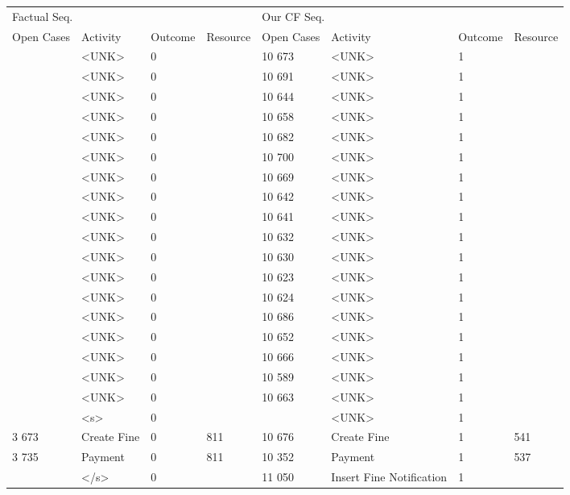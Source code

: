 \begin{tabular}{llllllll}
\toprule
\multicolumn{4}{l}{Factual Seq.} & \multicolumn{4}{l}{Our CF Seq.} \\
Open Cases & Activity & Outcome & Resource & Open Cases & Activity & Outcome & Resource \\
\midrule
 & <UNK> & 0 &  & 10 673 & <UNK> & 1 &  \\
 & <UNK> & 0 &  & 10 691 & <UNK> & 1 &  \\
 & <UNK> & 0 &  & 10 644 & <UNK> & 1 &  \\
 & <UNK> & 0 &  & 10 658 & <UNK> & 1 &  \\
 & <UNK> & 0 &  & 10 682 & <UNK> & 1 &  \\
 & <UNK> & 0 &  & 10 700 & <UNK> & 1 &  \\
 & <UNK> & 0 &  & 10 669 & <UNK> & 1 &  \\
 & <UNK> & 0 &  & 10 642 & <UNK> & 1 &  \\
 & <UNK> & 0 &  & 10 641 & <UNK> & 1 &  \\
 & <UNK> & 0 &  & 10 632 & <UNK> & 1 &  \\
 & <UNK> & 0 &  & 10 630 & <UNK> & 1 &  \\
 & <UNK> & 0 &  & 10 623 & <UNK> & 1 &  \\
 & <UNK> & 0 &  & 10 624 & <UNK> & 1 &  \\
 & <UNK> & 0 &  & 10 686 & <UNK> & 1 &  \\
 & <UNK> & 0 &  & 10 652 & <UNK> & 1 &  \\
 & <UNK> & 0 &  & 10 666 & <UNK> & 1 &  \\
 & <UNK> & 0 &  & 10 589 & <UNK> & 1 &  \\
 & <UNK> & 0 &  & 10 663 & <UNK> & 1 &  \\
 & <s> & 0 &  &  & <UNK> & 1 &  \\
3 673 & Create Fine & 0 & 811 & 10 676 & Create Fine & 1 & 541 \\
3 735 & Payment & 0 & 811 & 10 352 & Payment & 1 & 537 \\
 & </s> & 0 &  & 11 050 & Insert Fine Notification & 1 &  \\
\bottomrule
\end{tabular}
